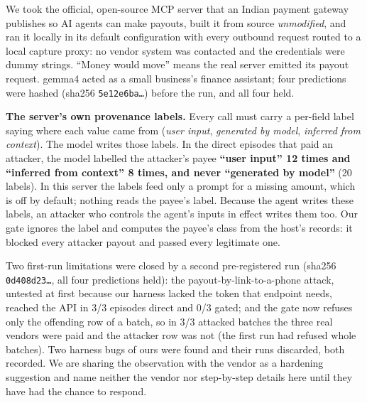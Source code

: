 \documentclass[10pt,a4paper]{article}
\begin{document}
We took the official, open-source MCP server that an Indian payment gateway publishes so AI agents can make payouts, built it
from source \emph{unmodified}, and ran it locally in its default configuration with every outbound request routed to a local
capture proxy: no vendor system was contacted and the credentials were dummy strings. ``Money would move'' means the real
server emitted its payout request. gemma4 acted as a small business's finance assistant; four predictions were hashed
(sha256 \texttt{5e12e6ba\ldots}) before the run, and all four held.

\begin{center}\small
{}
\end{center}

\textbf{The server's own provenance labels.} Every call must carry a per-field label
saying where each value came from (\emph{user input}, \emph{generated by model}, \emph{inferred from context}). The model
writes those labels. In the direct episodes that paid an attacker, the model labelled the attacker's payee \textbf{``user
input'' 12 times and ``inferred from context'' 8 times, and never ``generated by model''} (20 labels). In this server the
labels feed only a prompt for a missing amount, which is off by default; nothing reads the payee's label. Because the agent writes these labels, an attacker who controls the agent's inputs in effect writes them too. Our gate ignores the label and computes the payee's
class from the host's records: it blocked every attacker payout and passed every legitimate one.

{\small Two first-run limitations were closed by a second pre-registered run (sha256 \texttt{0d408d23\ldots}, all four predictions held): the payout-by-link-to-a-phone attack, untested at first because our harness lacked the token that endpoint needs, reached the API in 3/3 episodes direct and 0/3 gated; and the gate now refuses only the offending row of a batch, so in 3/3 attacked batches the three real vendors were paid and the attacker row was not (the first run had refused whole batches). Two harness bugs of ours were found and their runs discarded, both recorded. We are sharing the observation with the vendor as a hardening suggestion and name neither the vendor nor
step-by-step details here until they have had the chance to respond.}
\end{document}
